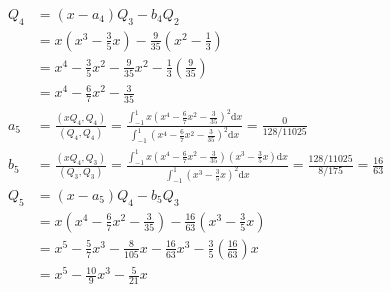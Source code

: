 {\begin{align*}
Q_4 &= (x- a_4) Q_3 - b_4 Q_2 \\
    &= x (x^3 - \frac{3}{5} x) - \frac{9}{35} (x^2 - \frac{1}{3}) \\
    &= x^4 - \frac{3}{5} x^2 - \frac{9}{35} x^2 - \frac{1}{3}
    (\frac{9}{35}) \\
    &\boxed{= x^4 - \frac{6}{7} x^2 - \frac{3}{35}}\\
a_5 &= \frac{(x Q_4, Q_4)}{(Q_4, Q_4)}
    = \frac{\int_{-1}^1 x (x^4 - \frac{6}{7} x^2 - \frac{3}{35})^2 \textrm{d}x}{\int_{-1}^1 (x^4 - \frac{6}{7} x^2 - \frac{3}{35})^2 \textrm{d}x}
    = \frac{0}{128/11025} \\
b_5 &= \frac{(x Q_4, Q_3)}{(Q_3, Q_3)}
    = \frac{\int_{-1}^1 x (x^4 - \frac{6}{7} x^2 - \frac{3}{35})(x^3 - \frac{3}{5} x) \textrm{d}x}{\int_{-1}^1 (x^3 - \frac{3}{5}
    x)^2 \textrm{d}x}
    = \frac{128/11025}{8/175}
    = \frac{16}{63} \\
Q_5 &= (x - a_5) Q_4 - b_5 Q_3 \\
    &= x (x^4 - \frac{6}{7} x^2 - \frac{3}{35}) - \frac{16}{63} (x^3
    - \frac{3}{5} x) \\
    &= x^5 - \frac{5}{7} x^3 - \frac{8}{105} x - \frac{16}{63} x^3
    - \frac{3}{5} (\frac{16}{63}) x \\
    &\boxed{= x^5 - \frac{10}{9} x^3 - \frac{5}{21} x}
\end{align*}

}
